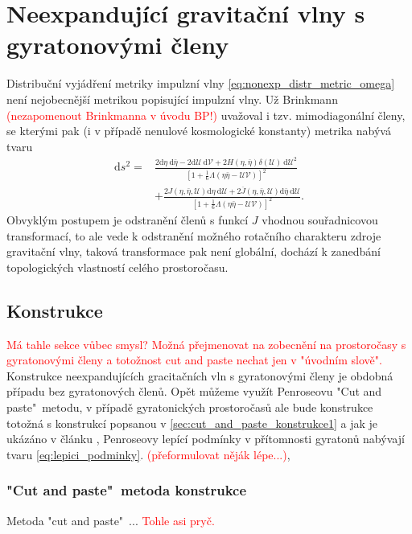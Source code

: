 \chapter{Neexpandující gravitační vlny s gyratonovými členy}
Distribuční vyjádření metriky impulzní vlny \eqref{eq:nonexp_distr_metric_omega} není nejobecnější metrikou popisující
impulzní vlny. Už Brinkmann \textcolor{red}{(nezapomenout Brinkmanna v úvodu BP!)} uvažoval i tzv. mimodiagonální členy, se kterými pak (i v případě nenulové kosmologické konstanty)
metrika nabývá tvaru
\begin{equation}
    \label{eq:nonexp_gyra_distrib_metric_omega}
    \begin{split}
        \mathrm{d}s^2=&\frac{2\mathrm{d}\eta~\mathrm{d}\bar{\eta} - 2 \mathrm{d}\mathcal{U}~\mathrm{d}\mathcal{V} + 2H(\eta, \bar{\eta}) \delta(\mathcal{U}) 
        ~\mathrm{d}\mathcal{U}^2}{\left[1+\frac{1}{6}\Lambda(\eta \bar{\eta}-\mathcal{U}\mathcal{V})\right]^2} \\
        &+ \frac{2J\left(\eta, \bar{\eta}, \mathcal{U}\right) \mathrm{d}\eta~\mathrm{d}\mathcal{U}
        +2\overline{J}\left(\eta, \bar{\eta}, \mathcal{U}\right) \mathrm{d}\bar{\eta}~\mathrm{d}\mathcal{U}}{\left[1+\frac{1}{6}\Lambda(\eta \bar{\eta}-\mathcal{U}\mathcal{V})\right]^2}.
    \end{split}
\end{equation}
Obvyklým postupem je odstranění členů s funkcí $J$ vhodnou souřadnicovou transformací, to ale vede k odstranění
možného rotačního charakteru zdroje gravitační vlny, taková transformace pak není globální, dochází k
zanedbání topologických vlastností celého prostoročasu.

\section{Konstrukce}
\textcolor{red}{Má tahle sekce vůbec smysl? Možná přejmenovat na zobecnění na prostoročasy s gyratonovými členy a 
totožnost cut and paste nechat jen v "úvodním slově".}
Konstrukce neexpandujících gracitačních vln s gyratonovými členy je obdobná případu bez gyratonových
členů. Opět můžeme využít Penroseovu "Cut and paste"\ metodu, v případě gyratonických prostoročasů ale bude
konstrukce totožná s konstrukcí popsanou v \eqref{sec:cut_and_paste_konstrukce1} a jak je ukázáno v článku \cite{Podolsky_2017}, Penroseovy lepící podmínky 
v přítomnosti gyratonů nabývají tvaru \eqref{eq:lepici_podminky}. \textcolor{red}{(přeformulovat něják lépe...)},

\subsection{"Cut and paste"\ metoda konstrukce}
Metoda "cut and paste"\ ... \textcolor{red}{Tohle asi pryč.}
